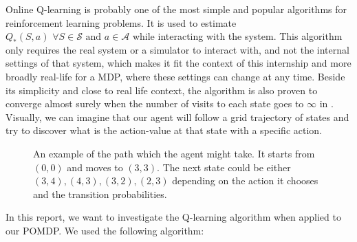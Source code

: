 \documentclass[
  a4paper, xcolor = usenames,dvipsnames]{article}
\theoremstyle{definition}
\theoremstyle{definition}
\theoremstyle{definition}
\theoremstyle{definition}
\theoremstyle{remark}
\begin{document}
Online Q-learning is probably one of the most simple and popular algorithms for reinforcement learning problems. It is used to estimate \(Q_{*}(S, a) \,\, \forall S \in \mathcal{S} \text{ and } a \in \mathcal{A}\) while interacting with the system. This algorithm only requires the real system or a simulator to interact with, and not the internal settings of that system, which makes it fit the context of this internship and more broadly real-life for a MDP, where these settings can change at any time. Beside its simplicity and close to real life context, the algorithm is also proven to converge almost surely when the number of visits to each state goes to \(\infty\) in \autocite{q-learning-converge}. Visually, we can imagine that our agent will follow a grid trajectory of states and try to discover what is the action-value at that state with a specific action.

\begin{figure}
\centering
\def\mycolumns{5}
\def\myrows{5}
\caption[An example of the path which the agent might take]{An example of the path which the agent might take. It starts from $(0, 0)$ and moves to $(3, 3)$. The next state could be either $(3, 4), (4, 3), (3, 2), (2, 3)$ depending on the action it chooses and the transition probabilities.}
\end{figure}

In this report, we want to investigate the Q-learning algorithm when applied to our POMDP. We used the following algorithm:
\end{document}
